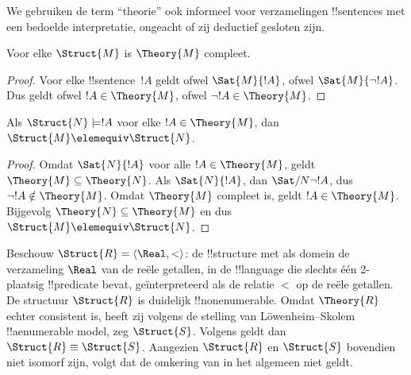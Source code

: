 \documentclass[openany]{memoir}
\begin{document}
We gebruiken de term ``theorie'' ook informeel voor verzamelingen
!!{sentence}s met een bedoelde interpretatie, ongeacht of zij deductief
gesloten zijn.

\begin{prop}
Voor elke $\Struct{M}$ is $\Theory{M}$ compleet.
\end{prop}

\begin{proof}
Voor elke !!{sentence}~$!A$ geldt ofwel $\Sat{M}{!A}$, ofwel
$\Sat{M}{\lnot !A}$. Dus geldt ofwel $!A \in \Theory{M}$, ofwel
$\lnot !A \in \Theory{M}$.
\end{proof}

\begin{prop}
  Als $\Struct{N} \models !A$ voor elke $!A \in \Theory{M}$, dan
  $\Struct{M} \elemequiv \Struct{N}$.
\end{prop}

\begin{proof}
Omdat $\Sat{N}{!A}$ voor alle $!A \in \Theory{M}$, geldt
$\Theory{M} \subseteq \Theory{N}$. Als $\Sat{N}{!A}$, dan
$\Sat/{N}{\lnot !A}$, dus $\lnot !A \notin \Theory{M}$. Omdat
$\Theory{M}$ compleet is, geldt $!A \in \Theory{M}$. Bijgevolg
$\Theory{N} \subseteq \Theory{M}$ en dus
$\Struct{M} \elemequiv \Struct{N}$.
\end{proof}

\begin{rem}
  Beschouw $\Struct{R} = \langle\Real, <\rangle$: de !!{structure} met
  als domein de verzameling $\Real$ van de reële getallen, in de
  !!{language} die slechts één 2-plaatsig !!{predicate} bevat, geïnterpreteerd
  als de relatie $<$ op de reële getallen. De structuur $\Struct{R}$ is
  duidelijk !!{nonenumerable}. Omdat $\Theory{R}$ echter consistent is,
  heeft zij volgens de stelling van L\"owenheim--Skolem !!a{enumerable}
  model, zeg $\Struct{S}$. Volgens  geldt dan
  $\Struct{R} \equiv \Struct{S}$. Aangezien $\Struct{R}$ en $\Struct{S}$
  bovendien niet isomorf zijn, volgt dat de omkering van
   in het algemeen niet geldt.
\end{rem}
\endgroup

\begingroup
\def\olfilename{OLP-0189}
\def\olfilepath{content/model-theory/basics/}
\hypertarget{unit-OLP-0189}{}
\end{document}

